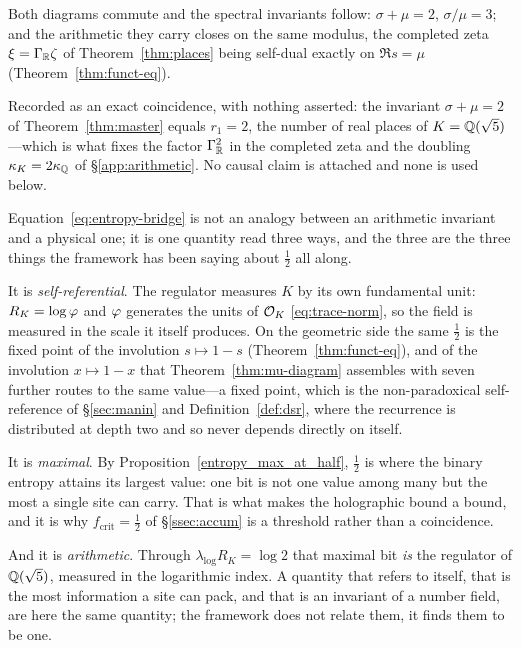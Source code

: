 \begin{theorem}\label{thm:master}
Both diagrams commute and the spectral invariants follow:
$\sigma+\mu=2$, $\sigma/\mu=3$; and the arithmetic they carry closes on the same modulus, the
completed zeta $\xi=\Gamma_{\mathbb{R}}\zeta$ of Theorem~\ref{thm:places} being self-dual exactly on
$\Re s=\mu$ (Theorem~\ref{thm:funct-eq}).

\end{theorem}

\begin{remark}\label{rmk:sum-places}
Recorded as an exact coincidence, with nothing asserted: the invariant $\sigma+\mu=2$ of
Theorem~\ref{thm:master} equals $r_1=2$, the number of real places of $K=\mathbb{Q}(\sqrt5)$---which is
what fixes the factor $\Gamma_{\mathbb{R}}^{2}$ in the completed zeta and the doubling
$\kappa_K=2\kappa_{\mathbb{Q}}$ of \S\ref{app:arithmetic}. No causal claim is attached and none is used
below.
\end{remark}
\begin{remark}\label{rmk:bit-three-readings}
Equation~\eqref{eq:entropy-bridge} is not an analogy between an arithmetic invariant and a physical
one; it is one quantity read three ways, and the three are the three things the framework has been
saying about $\tfrac12$ all along.

It is \emph{self-referential}. The regulator measures $K$ by its own fundamental unit: $R_K=\log\varphi$
and $\varphi$ generates the units of $\mathcal{O}_K$ \eqref{eq:trace-norm}, so the field is measured in the
scale it itself produces. On the geometric side the same $\tfrac12$ is the fixed point of the
involution $s\mapsto1-s$ (Theorem~\ref{thm:funct-eq}), and of the involution $x\mapsto1-x$ that
Theorem~\ref{thm:mu-diagram} assembles with seven further routes to the same value---a fixed point,
which is the non-paradoxical self-reference of
\S\ref{sec:manin} and Definition~\ref{def:dsr}, where the recurrence is distributed at depth two and
so never depends directly on itself.

It is \emph{maximal}. By Proposition~\ref{entropy_max_at_half}, $\tfrac12$ is where the binary entropy
attains its largest value: one bit is not one value among many but the most a single site can carry.
That is what makes the holographic bound a bound, and it is why $f_{\mathrm{crit}}=\tfrac12$ of
\S\ref{ssec:accum} is a threshold rather than a coincidence.

And it is \emph{arithmetic}. Through $\lambda_{\log}R_K=\log2$ that maximal bit \emph{is} the
regulator of $\mathbb{Q}(\sqrt5)$, measured in the logarithmic index. A quantity that refers to itself, that
is the most information a site can pack, and that is an invariant of a number field, are here the
same quantity; the framework does not relate them, it finds them to be one.
\end{remark}
